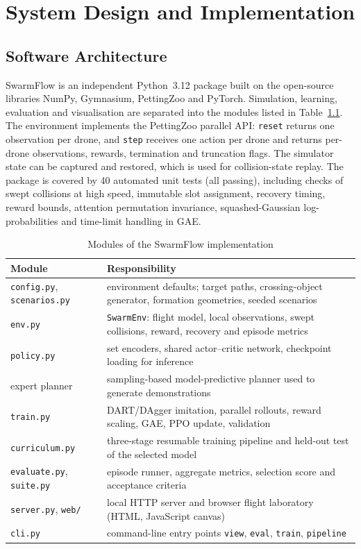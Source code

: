 \chapter{System Design and Implementation}
\label{ch:implementation}

\section{Software Architecture}
SwarmFlow is an independent Python~3.12 package built on the open-source libraries NumPy, Gymnasium, PettingZoo
and PyTorch. Simulation, learning, evaluation and
visualisation are separated into the modules listed in Table~\ref{tab:modules}. The environment implements the
PettingZoo parallel API: \texttt{reset} returns one observation per drone, and \texttt{step} receives one
action per drone and returns per-drone observations, rewards, termination and truncation flags. The simulator
state can be captured and restored, which is used for collision-state replay. The package is covered by 40
automated unit tests (all passing), including checks of swept collisions at high speed, immutable slot
assignment, recovery timing, reward bounds, attention permutation invariance, squashed-Gaussian
log-probabilities and time-limit handling in GAE.

\begin{table}[htbp]
\centering
\caption{Modules of the SwarmFlow implementation}
\label{tab:modules}
\small
\begin{tabularx}{\textwidth}{@{}lX@{}}
\toprule
Module & Responsibility\\
\midrule
\texttt{config.py}, \texttt{scenarios.py} & environment defaults; target paths, crossing-object generator, formation geometries, seeded scenarios\\
\texttt{env.py} & \texttt{SwarmEnv}: flight model, local observations, swept collisions, reward, recovery and episode metrics\\
\texttt{policy.py} & set encoders, shared actor--critic network, checkpoint loading for inference\\
expert planner & sampling-based model-predictive planner used to generate demonstrations\\
\texttt{train.py} & DART/DAgger imitation, parallel rollouts, reward scaling, GAE, PPO update, validation\\
\texttt{curriculum.py} & three-stage resumable training pipeline and held-out test of the selected model\\
\texttt{evaluate.py}, \texttt{suite.py} & episode runner, aggregate metrics, selection score and acceptance criteria\\
\texttt{server.py}, \texttt{web/} & local HTTP server and browser flight laboratory (HTML, JavaScript canvas)\\
\texttt{cli.py} & command-line entry points \texttt{view}, \texttt{eval}, \texttt{train}, \texttt{pipeline}\\
\bottomrule
\end{tabularx}
\end{table}

